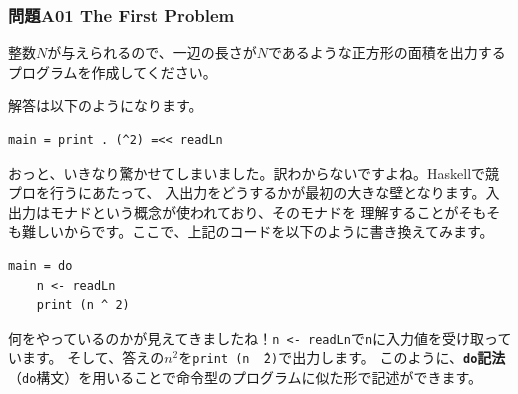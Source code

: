 \subsubsection{問題A01 The First Problem}

\begin{toi*}
  整数$N$が与えられるので、一辺の長さが$N$であるような正方形の面積を出力するプログラムを作成してください。
\end{toi*}

\begin{ans*}
解答は以下のようになります。
\begin{lstlisting}[caption={}]
main = print . (^2) =<< readLn
\end{lstlisting}
おっと、いきなり驚かせてしまいました。訳わからないですよね。Haskellで競プロを行うにあたって、
入出力をどうするかが最初の大きな壁となります。入出力はモナドという概念が使われており、そのモナドを
理解することがそもそも難しいからです。ここで、上記のコードを以下のように書き換えてみます。
\begin{lstlisting}[caption={}]
main = do
    n <- readLn
    print (n ^ 2)
\end{lstlisting}
何をやっているのかが見えてきましたね！\texttt{n <- readLn}で\texttt{n}に入力値を受け取っています。
そして、答えの$n^2$を\texttt{print (n \^ \ 2)}で出力します。
このように、{\bf \texttt{do}記法}（\texttt{do}構文）を用いることで命令型のプログラムに似た形で記述ができます。


\end{ans*}
